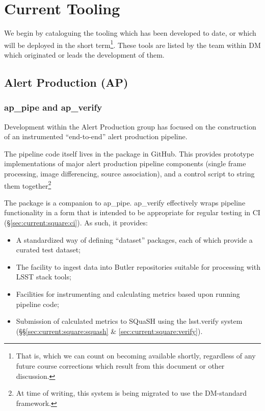 \documentclass[DM,authoryear,toc,lsstdraft]{lsstdoc}
\begin{document}
\section{Current Tooling}
\label{sec:current}

We begin by cataloguing the tooling which has been developed to date, or which
will be deployed in the short term\footnote{That is, which we can count on
becoming available shortly, regardless of any future course corrections which
result from this document or other discussion.}. These tools are listed by the
team within DM which originated or leads the development of them.

\subsection{Alert Production (AP)}
\label{sec:current:ap}

\subsubsection{ap\_pipe and ap\_verify}

Development within the Alert Production group has focused on the construction
of an instrumented ``end-to-end'' alert production pipeline.

The pipeline code itself lives in the  package in
GitHub. This provides prototype implementations of major alert production
pipeline components (single frame processing, image differencing, source
association), and a control script to string them together\footnote{At time of
writing, this system is being migrated to use the DM-standard
 framework.}

The  package is a companion to ap\_pipe. ap\_verify
effectively wraps pipeline functionality in a form that is intended to be
appropriate for regular testing in CI (\S\ref{sec:current:square:ci}). As
such, it provides:

\begin{itemize}

  \item{A standardized way of defining ``dataset'' packages, each of which
  provide a curated test dataset;}
  \item{The facility to ingest data into Butler repositories suitable for
  processing with LSST stack tools;}
  \item{Facilities for instrumenting and calculating \glspl{metric} based upon
  running pipeline code;}
  \item{Submission of calculated metrics to SQuaSH using the lsst.verify
  system (\S\S\ref{sec:current:square:squash} \&
  \ref{sec:current:square:verify}).}

\end{itemize}
\end{document}
